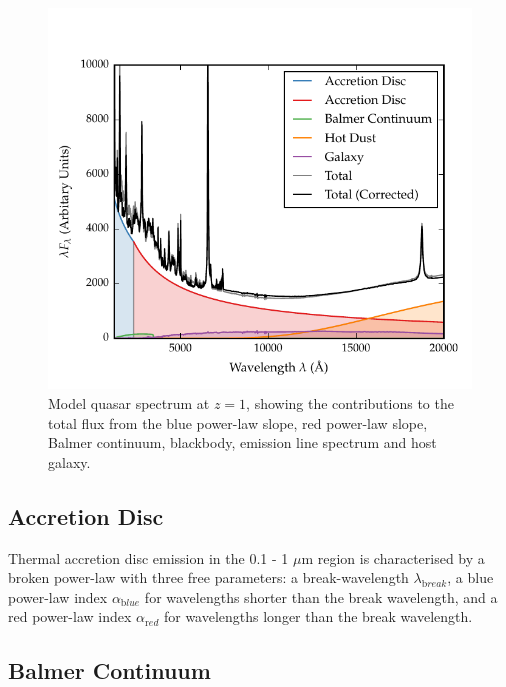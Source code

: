 \begin{figure}
  \centering
  \includegraphics[width=\textwidth]{figures/chapter05/sed_model.pdf}
  \caption[{Model quasar spectrum at $z=1$, showing the contributions to the total flux from the blue power-law slope, red power-law slope, Balmer continuum, blackbody, emission line spectrum and host galaxy.}]{Model quasar spectrum at $z=1$, showing the contributions to the total flux from the blue power-law slope, red power-law slope, Balmer continuum, blackbody, emission line spectrum and host galaxy. }
  \label{fig:modelsed}
\end{figure}


\subsection{Accretion Disc}

Thermal accretion disc emission in the 0.1 - 1 $\mu$m region is characterised by a broken power-law with three free parameters: a break-wavelength $\lambda_{\mathrm break}$, a blue power-law index $\alpha_{\mathrm blue}$ for wavelengths shorter than the break wavelength, and a red power-law index $\alpha_{\mathrm red}$ for wavelengths longer than the break wavelength.

\subsection{Balmer Continuum}

